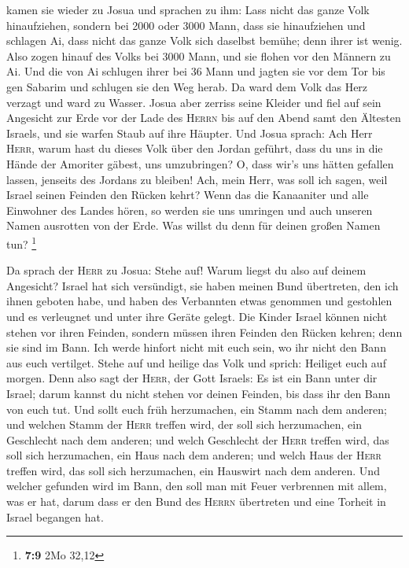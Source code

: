  kamen sie wieder zu Josua und sprachen zu ihm: Lass nicht
das ganze Volk hinaufziehen, sondern bei 2000 oder 3000 Mann, dass sie
hinaufziehen und schlagen Ai, dass nicht das ganze Volk sich daselbst
bemühe; denn ihrer ist wenig.  Also zogen hinauf des Volks
bei 3000 Mann, und sie flohen vor den Männern zu Ai.  Und
die von Ai schlugen ihrer bei 36 Mann und jagten sie vor dem Tor bis gen
Sabarim und schlugen sie den Weg herab. Da ward dem Volk das Herz
verzagt und ward zu Wasser.  Josua aber zerriss seine
Kleider und fiel auf sein Angesicht zur Erde vor der Lade des
\textsc{Herrn} bis auf den Abend samt den Ältesten Israels, und sie
warfen Staub auf ihre Häupter.  Und Josua sprach: Ach Herr
\textsc{Herr}, warum hast du dieses Volk über den Jordan geführt, dass
du uns in die Hände der Amoriter gäbest, uns umzubringen? O, dass wir's
uns hätten gefallen lassen, jenseits des Jordans zu bleiben!
 Ach, mein Herr, was soll ich sagen, weil Israel seinen
Feinden den Rücken kehrt?  Wenn das die Kanaaniter und
alle Einwohner des Landes hören, so werden sie uns umringen und auch
unseren Namen ausrotten von der Erde. Was willst du denn für deinen
großen Namen tun? \footnote{\textbf{7:9} 2Mo 32,12}

 Da sprach der \textsc{Herr} zu Josua: Stehe auf! Warum
liegst du also auf deinem Angesicht?  Israel hat sich
versündigt, sie haben meinen Bund übertreten, den ich ihnen geboten
habe, und haben des Verbannten etwas genommen und gestohlen und es
verleugnet und unter ihre Geräte gelegt.  Die Kinder
Israel können nicht stehen vor ihren Feinden, sondern müssen ihren
Feinden den Rücken kehren; denn sie sind im Bann. Ich werde hinfort
nicht mit euch sein, wo ihr nicht den Bann aus euch vertilget.
 Stehe auf und heilige das Volk und sprich: Heiliget euch
auf morgen. Denn also sagt der \textsc{Herr}, der Gott Israels: Es ist
ein Bann unter dir Israel; darum kannst du nicht stehen vor deinen
Feinden, bis dass ihr den Bann von euch tut.  Und sollt
euch früh herzumachen, ein Stamm nach dem anderen; und welchen Stamm der
\textsc{Herr} treffen wird, der soll sich herzumachen, ein Geschlecht
nach dem anderen; und welch Geschlecht der \textsc{Herr} treffen wird,
das soll sich herzumachen, ein Haus nach dem anderen; und welch Haus der
\textsc{Herr} treffen wird, das soll sich herzumachen, ein Hauswirt nach
dem anderen.  Und welcher gefunden wird im Bann, den soll
man mit Feuer verbrennen mit allem, was er hat, darum dass er den Bund
des \textsc{Herrn} übertreten und eine Torheit in Israel begangen hat.

